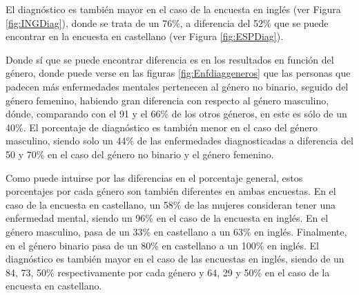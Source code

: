 \documentclass[12pt, a4paper,twoside,titlepage]{book}
\begin{document}
El diagnóstico es también mayor en el caso de la encuesta en inglés (ver Figura \ref{fig:INGDiag}), donde se trata de un 76\%, a diferencia del 52\% que se puede encontrar en la encuesta en castellano (ver Figura \ref{fig:ESPDiag}).

Donde sí que se puede encontrar diferencia es en los resultados en función del género, donde puede verse en las figuras \ref{fig:Enfdiaggeneros} que las personas que padecen más enfermedades mentales pertenecen al género no binario, seguido del género femenino, habiendo gran diferencia con respecto al género masculino, dónde, comparando con el 91 y el 66\% de los otros géneros, en este es sólo de un 40\%. El porcentaje de diagnóstico es también menor en el caso del género masculino, siendo solo un 44\% de las enfermedades diagnosticadas a diferencia del 50 y 70\% en el caso del género no binario y el género femenino. 

Como puede intuirse por las diferencias en el porcentaje general, estos porcentajes por cada género son también diferentes en ambas encuestas. En el caso de la encuesta en castellano, un 58\% de las mujeres consideran tener una enfermedad mental, siendo un 96\% en el caso de la encuesta en inglés. En el género masculino, pasa de un 33\% en castellano a un 63\% en inglés. Finalmente, en el género binario pasa de un 80\% en castellano a un 100\% en inglés. 
El diagnóstico es también mayor en el caso de las encuestas en inglés, siendo de un 84, 73, 50\% respectivamente por cada género y 64, 29 y 50\% en el caso de la encuesta en castellano. 
\end{document}

